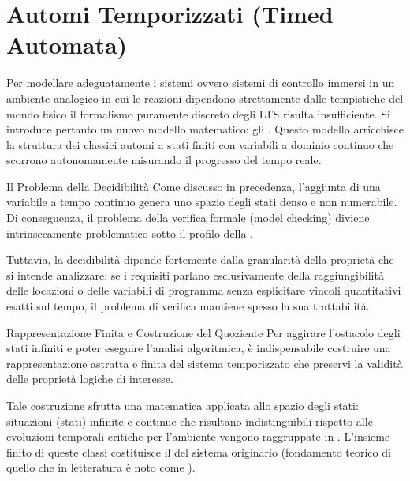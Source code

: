 \chapter{Automi Temporizzati (Timed Automata)}

Per modellare adeguatamente i sistemi  ovvero sistemi di controllo immersi in un ambiente analogico in cui le reazioni dipendono strettamente dalle tempistiche del mondo fisico il formalismo puramente discreto degli LTS risulta insufficiente. Si introduce pertanto un nuovo modello matematico: gli . Questo modello arricchisce la struttura dei classici automi a stati finiti con variabili a dominio continuo che scorrono autonomamente misurando il progresso del tempo reale.

\begin{observation}{Il Problema della Decidibilità}
    Come discusso in precedenza, l'aggiunta di una variabile a tempo continuo genera uno spazio degli stati denso e non numerabile. Di conseguenza, il problema della verifica formale (model checking) diviene intrinsecamente problematico sotto il profilo della .

    Tuttavia, la decidibilità dipende fortemente dalla granularità della proprietà che si intende analizzare: se i requisiti parlano esclusivamente della raggiungibilità delle locazioni o delle variabili di programma senza esplicitare vincoli quantitativi esatti sul tempo, il problema di verifica mantiene spesso la sua trattabilità.
\end{observation}

\begin{definition}{Rappresentazione Finita e Costruzione del Quoziente}
    Per aggirare l'ostacolo degli stati infiniti e poter eseguire l'analisi algoritmica, è indispensabile costruire una rappresentazione astratta e finita del sistema temporizzato che preservi la validità delle proprietà logiche di interesse.

    Tale costruzione sfrutta una  matematica applicata allo spazio degli stati: situazioni (stati) infinite e continue che risultano indistinguibili rispetto alle evoluzioni temporali critiche per l'ambiente vengono raggruppate in . L'insieme finito di queste classi costituisce il  del sistema originario (fondamento teorico di quello che in letteratura è noto come ).
\end{definition}